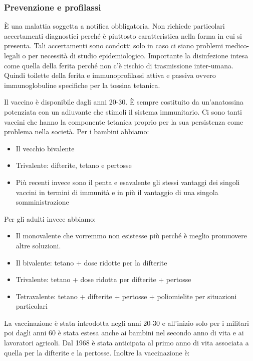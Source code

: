 \subsubsection{Prevenzione e profilassi}

  È una malattia soggetta a notifica obbligatoria. Non richiede
  particolari accertamenti diagnostici perché è piuttosto caratteristica
  nella forma in cui si presenta. Tali accertamenti sono condotti solo
  in caso ci siano problemi medico-legali o per necessità di studio
  epidemiologico. Importante la disinfezione intesa come quella della
  ferita perché non c'è rischio di trasmissione inter-umana. Quindi
  toilette della ferita e immunoprofilassi attiva e passiva ovvero
  immunoglobuline specifiche per la tossina tetanica.

  Il vaccino è disponibile dagli anni 20-30. È sempre costituito da
  un'anatossina potenziata con un adiuvante che stimoli il sistema
  immunitario. Ci sono tanti vaccini che hanno la componente tetanica
  proprio per la sua persistenza come problema nella società. Per i
  bambini abbiamo:

\begin{itemize}
\item
  Il vecchio bivalente
\item
  Trivalente: difterite, tetano e pertosse
\item
  Più recenti invece sono il penta e esavalente gli stessi vantaggi dei
  singoli vaccini in termini di immunità e in più il vantaggio di una
  singola somministrazione
\end{itemize}
  Per gli adulti invece abbiamo:

\begin{itemize}
\item
  Il monovalente che vorremmo non esistesse più perché è meglio
  promuovere altre soluzioni.
\item
  Il bivalente: tetano + dose ridotte per la difterite
\item
  Trivalente: tetano + dose ridotta per difterite + pertosse
\item
  Tetravalente: tetano + difterite + pertosse + poliomielite per
  situazioni particolari
\end{itemize}
  La vaccinazione è stata introdotta negli anni 20-30 e all'inizio solo
  per i militari poi dagli anni 60 è stata estesa anche ai bambini nel
  secondo anno di vita e ai lavoratori agricoli. Dal 1968 è stata
  anticipata al primo anno di vita associata a quella per la difterite e
  la pertosse. Inoltre la vaccinazione è:

